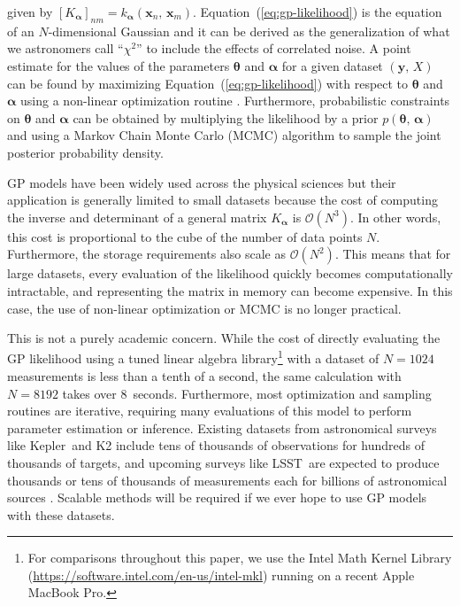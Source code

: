 \documentclass[manuscript, letterpaper]{aastex6}
\newcommand{\project}[1]{\textsf{#1}}
\newcommand{\kepler}{\project{Kepler}}
\newcommand{\lsst}{\project{LSST}}
\renewcommand{\eqref}[1]{\ref{eq:#1}}
\newcommand{\Eq}[1]{Equation~(\eqref{#1})}
\newcommand{\eq}[1]{\Eq{#1}}
\newcommand{\bvec}[1]{{\ensuremath{\boldsymbol{#1}}}}
\newcommand{\response}[1]{{\color{blue}#1}}
\begin{document}
given by $[K_\bvec{\alpha}]_{nm} = k_\bvec{\alpha}(\bvec{x}_n,\,\bvec{x}_m)$.
\eq{gp-likelihood} is the equation of an $N$-dimensional Gaussian and it can
be derived as the generalization of what we astronomers call ``$\chi^2$''
to include the effects of correlated noise.
A point estimate for the values of the parameters $\bvec{\theta}$ and
$\bvec{\alpha}$ for a given dataset $(\bvec{y},\,X)$ can be found by
maximizing \eq{gp-likelihood} with respect to $\bvec{\theta}$ and
$\bvec{\alpha}$ using a non-linear optimization routine \citep{Nocedal:2006}.
\response{Furthermore}, probabilistic constraints on $\bvec{\theta}$ and
$\bvec{\alpha}$ can be obtained by multiplying the likelihood by a prior
$p(\bvec{\theta},\,\bvec{\alpha})$ and using a Markov Chain Monte Carlo (MCMC)
algorithm to sample the joint posterior probability density.

GP models have been widely used across the physical sciences but their
application is generally limited to small datasets because the cost of
computing the inverse and determinant of a general matrix $K_\bvec{\alpha}$ is
$\mathcal{O}(N^3)$.
In other words, this cost is proportional to the cube of the number of data
points $N$.
Furthermore, the storage requirements also scale as $\mathcal{O}(N^2)$.
This means that for large datasets, every evaluation of the likelihood quickly
becomes computationally intractable, and representing the matrix in memory can
become expensive.
In this case, the use of non-linear optimization or MCMC is no longer
practical.

\response{This is not a purely academic concern.
While the cost of directly evaluating the GP likelihood using a tuned linear
algebra library\footnote{For comparisons throughout this paper, we use the
Intel Math Kernel Library (\url{https://software.intel.com/en-us/intel-mkl})
running on a recent Apple MacBook Pro.} with a dataset of $N=1024$
measurements is less than a tenth of a second, the same calculation with
$N=8192$ takes over 8~seconds.
Furthermore, most optimization and sampling routines are iterative, requiring
many evaluations of this model to perform parameter estimation or inference.
Existing datasets from astronomical surveys like \kepler\ and \project{K2}
include tens of thousands of observations for hundreds of thousands of
targets, and upcoming surveys like \lsst\ are expected to produce thousands or
tens of thousands of measurements each for billions of astronomical sources
\citep{Ivezic:2008}.
Scalable methods will be required if we ever hope to use GP models with these
datasets.
}
\end{document}
